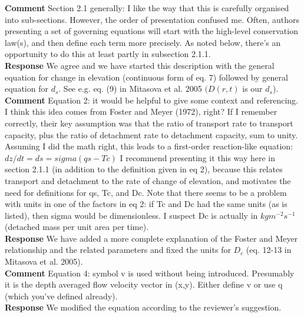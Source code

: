 \documentclass[gmd, manuscript]{copernicus}
\begin{document}
\noindent\textbf{Comment}
Section 2.1 generally: I like the way that this is carefully organised into sub-sections. However, the order of presentation confused me. Often, authors presenting a set of governing equations will start with the high-level conservation law(s), and then define each term more precisely. As noted below, there’s an opportunity to do this at least partly in subsection 2.1.1.
\\

\noindent\textbf{Response}
We agree and we have started this description with the general  equation for change in elevation (continuous form of eq. 7) followed by general equation for $d_s$.  See e.g. eq. (9) in Mitasova et al. 2005 $(D(r,t)$ is our $d_s$).
\\

\noindent\textbf{Comment}
Equation 2: it would be helpful to give some context and referencing. I think this idea comes from Foster and Meyer (1972), right? If I remember correctly, their key assumption was that the ratio of transport rate to transport capacity, plus the ratio of detachment rate to detachment capacity, sum to unity. Assuming I did the math right, this leads to a first-order reaction-like equation: $dz/dt = ds = sigma (qs - Tc)$ I recommend presenting it this way here in section 2.1.1 (in addition to the definition given in eq 2), because this relates transport and detachment to the rate of change of elevation, and motivates the need for definitions for qs, Tc, and Dc. Note that there seems to be a problem with units in one of the factors in eq 2: if Tc and Dc had the same units (as is listed), then sigma would be dimensionless. I suspect Dc is actually in $kg m^{-2} s^{-1}$ (detached mass per unit area per time).
\\

\noindent\textbf{Response}
We have added a more complete explanation of the Foster and Meyer relationship and the related parameters and fixed the units for $D_c$ (eq. 12-13 in Mitasova et al. 2005).
\\

\noindent\textbf{Comment}
Equation 4: symbol v is used without being introduced. Presumably it is the depth averaged flow velocity vector in (x,y). Either define v or use q (which you’ve defined already).
\\

\noindent\textbf{Response}
We modified the equation according to the reviewer’s suggestion.
\\
\end{document}
